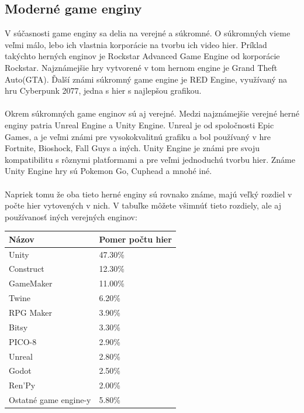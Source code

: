 \documentclass[10pt,oneside,slovak,a4paper,hidelinks]{article}
\begin{document}
	\subsection{Moderné game enginy}
		V súčasnosti game enginy sa delia na verejné a súkromné. O súkromných vieme veľmi málo, lebo ich vlastnia korporácie na tvorbu ich video hier. Príklad takýchto herných enginov je Rockstar Advanced Game Engine od korporácie Rockstar. Najznámejšie hry vytvorené v tom hernom engine je Grand Theft Auto(GTA). Ďalší známi súkromný game engine je RED Engine, využívaný na hru Cyberpunk 2077, jedna s hier s najlepšou grafikou.
		\paragraph{}Okrem súkromných game enginov sú aj verejné. Medzi najznámejšie verejné herné enginy patria Unreal Engine a Unity Engine. Unreal je od spoločnosti Epic Games, a je veľmi známi pre vysokokvalitnú grafiku a bol používaný v hre Fortnite, Bioshock, Fall Guys a iných. Unity Engine je známi pre svoju kompatibilitu s rôznymi platformami a pre veľmi jednoduchú tvorbu hier. Známe Unity Engine hry sú Pokemon Go, Cuphead a mnohé iné.
		\paragraph{}Napriek tomu že oba tieto herné enginy sú rovnako známe, majú veľký rozdiel v počte hier vytovených v nich. V tabuľke môžete všimnúť tieto rozdiely, ale aj používanosť iných verejných enginov:
		\hspace*{\fill}
		\begin{center}
			\begin{tabular}{|p{5cm}|p{5cm}|}
				\hline
				Názov & Pomer počtu hier\\
				\hline\hline
				Unity		& 47.30\%\\
				Construct	& 12.30\%\\
				GameMaker	& 11.00\%\\
				Twine		& 6.20\%\\
				RPG Maker	& 3.90\%\\
				Bitsy		& 3.30\%\\
				PICO-8		& 2.90\%\\
				Unreal		& 2.80\%\\
				Godot		& 2.50\%\\
				Ren'Py		& 2.00\%\\
				Ostatné game engine-y	& 5.80\%\\
				\hline
			\end{tabular}
		\end{center}
\end{document}
